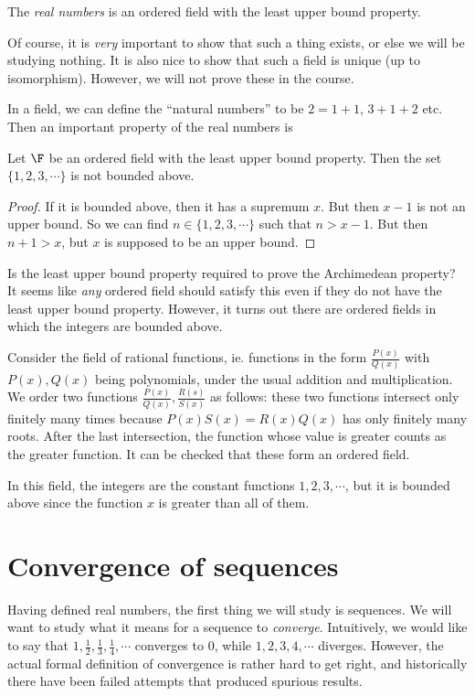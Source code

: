 \documentclass[a4paper]{article}
\begin{document}
\begin{defi}
  The \emph{real numbers} is an ordered field with the least upper bound property.
\end{defi}
Of course, it is \emph{very} important to show that such a thing exists, or else we will be studying nothing. It is also nice to show that such a field is unique (up to isomorphism). However, we will not prove these in the course.

In a field, we can define the ``natural numbers'' to be $2 = 1 + 1$, $3 + 1 + 2$ etc. Then an important property of the real numbers is
\begin{lemma}
  Let $\F$ be an ordered field with the least upper bound property. Then the set $\{1, 2, 3, \cdots\}$ is not bounded above.
\end{lemma}

\begin{proof}
  If it is bounded above, then it has a supremum $x$. But then $x - 1$ is not an upper bound. So we can find $n\in \{1, 2, 3, \cdots\}$ such that $n> x - 1$. But then $n + 1 > x$, but $x$ is supposed to be an upper bound.
\end{proof}

Is the least upper bound property required to prove the Archimedean property? It seems like \emph{any} ordered field should satisfy this even if they do not have the least upper bound property. However, it turns out there are ordered fields in which the integers are bounded above.

Consider the field of rational functions, ie. functions in the form $\frac{P(x)}{Q(x)}$ with $P(x), Q(x)$ being polynomials, under the usual addition and multiplication. We order two functions $\frac{P(x)}{Q(x)}, \frac{R(s)}{S(x)}$ as follows: these two functions intersect only finitely many times because $P(x)S(x) = R(x)Q(x)$ has only finitely many roots. After the last intersection, the function whose value is greater counts as the greater function. It can be checked that these form an ordered field.

In this field, the integers are the constant functions $1, 2, 3, \cdots$, but it is bounded above since the function $x$ is greater than all of them.

\section{Convergence of sequences}
Having defined real numbers, the first thing we will study is sequences. We will want to study what it means for a sequence to \emph{converge}. Intuitively, we would like to say that $1, \frac{1}{2}, \frac{1}{3}, \frac{1}{4},\cdots$ converges to $0$, while $1, 2, 3, 4, \cdots$ diverges. However, the actual formal definition of convergence is rather hard to get right, and historically there have been failed attempts that produced spurious results.
\end{document}
